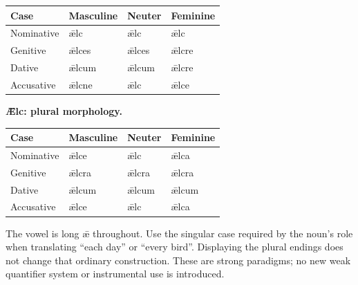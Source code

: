 \par\begingroup
\fontsize{10.5}{13.2}\selectfont
\setlength{\LTleft}{0pt}\setlength{\LTright}{\fill}
\noindent
\begin{tabular}{@{}>{\raggedright\arraybackslash}p{22.0mm}>{\raggedright\arraybackslash}p{31.188mm}>{\raggedright\arraybackslash}p{31.188mm}>{\raggedright\arraybackslash}p{31.188mm}@{}}
\toprule
\textbf{Case} & \textbf{Masculine} & \textbf{Neuter} & \textbf{Feminine} \\
\midrule
Nominative & ǣlc & ǣlc & ǣlc \\
Genitive & ǣlces & ǣlces & ǣlcre \\
Dative & ǣlcum & ǣlcum & ǣlcre \\
Accusative & ǣlcne & ǣlc & ǣlce \\
\bottomrule
\end{tabular}
\par\endgroup
\textbf{Ǣlc: plural morphology.}

\par\begingroup
\fontsize{10.5}{13.2}\selectfont
\setlength{\LTleft}{0pt}\setlength{\LTright}{\fill}
\noindent
\begin{tabular}{@{}>{\raggedright\arraybackslash}p{22.0mm}>{\raggedright\arraybackslash}p{31.188mm}>{\raggedright\arraybackslash}p{31.188mm}>{\raggedright\arraybackslash}p{31.188mm}@{}}
\toprule
\textbf{Case} & \textbf{Masculine} & \textbf{Neuter} & \textbf{Feminine} \\
\midrule
Nominative & ǣlce & ǣlc & ǣlca \\
Genitive & ǣlcra & ǣlcra & ǣlcra \\
Dative & ǣlcum & ǣlcum & ǣlcum \\
Accusative & ǣlce & ǣlc & ǣlca \\
\bottomrule
\end{tabular}
\par\endgroup
The vowel is long ǣ throughout. Use the singular case required by the noun’s role when translating “each day” or “every bird”. Displaying the plural endings does not change that ordinary construction. These are strong paradigms; no new weak quantifier system or instrumental use is introduced.

